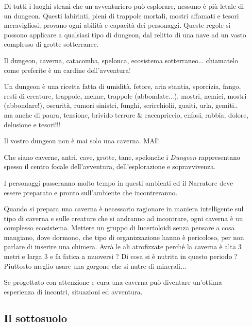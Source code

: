 \label{avventure-nei-dungeon}
\begin{multicols}{2}

Di tutti i luoghi strani che un avventuriero può esplorare, nessuno è più letale di un dungeon. Questi labirinti, pieni di trappole mortali, mostri affamati e tesori meravigliosi, provano ogni abilità e capacità dei personaggi. Queste regole si possono applicare a qualsiasi tipo di dungeon, dal relitto di una nave ad un vasto complesso di grotte sotterranee.

\begin{changemargin}{0.3cm}{0.3cm}\begin{narratore}
Il dungeon, caverna, catacomba, spelonca, ecosistema sotterraneo... chiamatelo come preferite è un cardine dell'avventura!

Un dungeon è una ricetta fatta di umidità, fetore, aria stantia, sporcizia, fango, resti di creature, trappole, melme, trappole (abbondate...), mostri, nemici, mostri (abbondare!), oscurità, rumori sinistri, funghi, scricchiolii, guaiti, urla, gemiti.. ma anche di paura, tensione, brivido terrore \& raccapriccio, enfasi, rabbia, dolore, delusione e tesori!!!

Il vostro dungeon non è mai solo una caverna. MAI!
\end{narratore}
\end{changemargin}

Che siano caverne, antri, cave, grotte, tane, spelonche i \emph{Dungeon} rappresentano spesso il centro focale dell'avventura, dell'esplorazione e sopravvivenza.

I personaggi passeranno molto tempo in questi ambienti ed il Narratore deve essere preparato e pronto sull'ambiente che incontreranno.

Quando si prepara una caverna è necessario ragionare in maniera intelligente sul tipo di caverna e sulle creature che si andranno ad incontrare, ogni caverna è un complesso ecosistema.
Mettere un gruppo di lucertoloidi senza pensare a cosa mangiano, dove dormono, che tipo di organizzazione hanno è pericoloso, per non parlare di inserire una chimera.
Avrà le ali atrofizzate perché la caverna è alta 3 metri e larga 3 e fa fatica a muoversi ? Di cosa si è nutrita in questo periodo ? Piuttosto meglio usare una gorgone che si nutre di minerali...

Se progettato con attenzione e cura una caverna può diventare un'ottima esperienza di incontri, situazioni ed avventura.

\subsection{Il sottosuolo}


\end{multicols}
